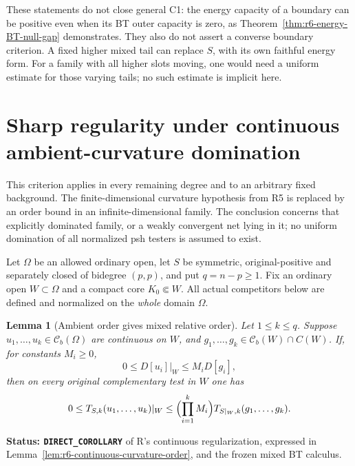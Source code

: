 \documentclass[11pt,a4paper]{article}
\numberwithin{equation}{section}
\newtheorem{lemma}[theorem]{Lemma}
\theoremstyle{definition}
\theoremstyle{remark}
\begin{document}
These statements do not close general C1: the energy capacity of a
boundary can be positive even when its BT outer capacity is zero,
as Theorem~\ref{thm:r6-energy-BT-null-gap} demonstrates. They also
do not assert a converse boundary criterion. A fixed higher mixed
tail can replace $S$, with its own faithful energy form. For a family
with all higher slots moving, one would need a uniform estimate for
those varying tails; no such estimate is implicit here.



\section{Sharp regularity under continuous ambient-curvature domination}
\label{sec:r6-capacity-dominated-curvatures}

This criterion applies in every remaining degree and to an arbitrary
fixed background. The finite-dimensional curvature hypothesis from R5
is replaced by an order bound in an infinite-dimensional family. The
conclusion concerns that explicitly dominated family, or a weakly
convergent net lying in it; no uniform domination of all normalized
psh testers is assumed to exist.

Let $\Omega$ be an allowed ordinary open, let $S$ be symmetric,
original-positive and separately closed of bidegree $(p,p)$, and put
$q=n-p\ge1$. Fix an ordinary open $W\subset\Omega$ and a compact
core $K_0\Subset W$. All actual competitors below are defined and
normalized on the \emph{whole} domain $\Omega$.

\begin{lemma}[Ambient order gives mixed relative order]
\label{lem:r6-mixed-curvature-domination}
Let $1\le k\le q$. Suppose $u_1,\ldots,u_k\in\mathcal C_b(\Omega)$
are continuous on $W$, and $g_1,\ldots,g_k\in\mathcal C_b(W)\cap C(W)$.
If, for constants $M_i\ge0$,
\[
                     0\le D[u_i]|_W\le M_iD[g_i],
\]
then on every original complementary test in $W$ one has
\begin{equation}
 0\le T_{S,k}(u_1,\ldots,u_k)|_W
          \le\Bigl(\prod_{i=1}^kM_i\Bigr)
                    T_{S|_W,k}(g_1,\ldots,g_k).
 \label{eq:r6-mixed-curvature-domination}
\end{equation}
\end{lemma}

\noindent\textbf{Status: \texttt{DIRECT\_COROLLARY}} of R's continuous
regularization, expressed in Lemma~\ref{lem:r6-continuous-curvature-order},
and the frozen mixed BT calculus.
\end{document}
